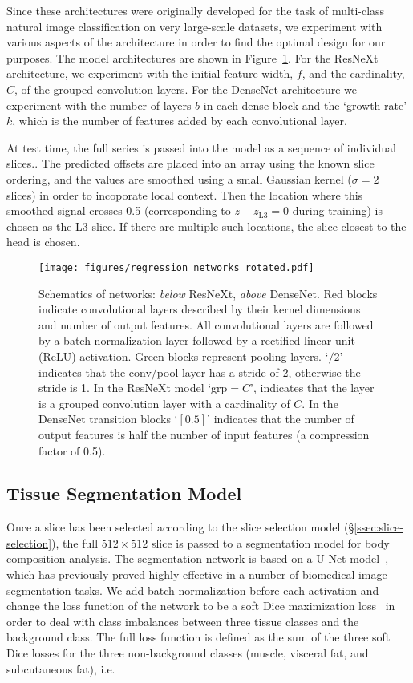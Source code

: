 \documentclass{llncs}
\begin{document}
Since these architectures were originally developed for the task of multi-class natural image classification on very large-scale datasets, we experiment with various aspects of the architecture in order to find the optimal design for our purposes.
The model architectures are shown in Figure~\ref{fig:regression-networks}.
For the ResNeXt architecture, we experiment with the initial feature width, $f$, and the cardinality, $C$, of the grouped convolution layers.
For the DenseNet architecture we experiment with the number of layers $b$ in each dense block and the `growth rate' $k$, which is the number of features added by each convolutional layer.

At test time, the full series is passed into the model as a sequence of individual slices..
The predicted offsets are placed into an array using the known slice ordering, and the values are smoothed using a small Gaussian kernel ($\sigma=2$ slices) in order to incoporate local context.
Then the location where this smoothed signal crosses 0.5 (corresponding to $z - z_{\text{L3}} = 0$ during training) is chosen as the L3 slice.
If there are multiple such locations, the slice closest to the head is chosen.

\begin{figure}[tb]
	\centering
	\texttt{[image: figures/regression\_networks\_rotated.pdf]}
	\caption{Schematics of networks: \textit{below} ResNeXt, \textit{above} DenseNet. Red blocks indicate convolutional layers described by their kernel dimensions and number of output features. All convolutional layers are followed by a batch normalization layer followed by a rectified linear unit (ReLU) activation. Green blocks represent pooling layers. `$/2$' indicates that the conv/pool layer has  a stride of 2, otherwise the stride is 1. In the ResNeXt model `grp$=C$', indicates that the layer is a grouped convolution layer with a cardinality of $C$. In the DenseNet transition blocks `$[0.5]$' indicates that the number of output features is half the number of input features (a compression factor of 0.5).}
	\label{fig:regression-networks}
\end{figure}\subsection{Tissue Segmentation Model}\label{ssec:segmentation}

Once a slice has been selected according to the slice selection model (\S\ref{ssec:slice-selection}), the full $512 \times 512$ slice is passed to a segmentation model for body composition analysis.
The segmentation network is based on a U-Net model~\cite{Ronneberger2015}, which has previously proved highly effective in a number of biomedical image segmentation tasks.
We add batch normalization before each activation and change the loss function of the network to be a soft Dice maximization loss~\cite{Milletari2016} in order to deal with class imbalances between three tissue classes and the background class.
The full loss function is defined as the sum of the three soft Dice losses for the three non-background classes (muscle, visceral fat, and subcutaneous fat), i.e.
\end{document}
